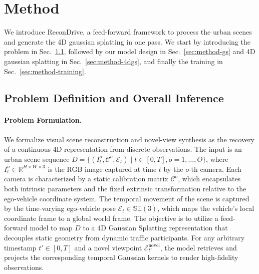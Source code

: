 \section{Method}
\label{sec:method}

We introduce ReconDrive, a feed-forward framework to process the urban scenes and generate the 4D gaussian splatting in one pass. We start by introducing the problem in Sec.~\ref{sec:method-problem}, followed by our model design in Sec.~\ref{sec:method-gs} and 4D gaussian splatting in Sec.~\ref{sec:method-4dgs}, and finally the training in Sec.~\ref{sec:method-training}.


\subsection{Problem Definition and Overall Inference}
\label{sec:method-problem}
\paragraph{Problem Formulation.} We formalize visual scene reconstruction and novel-view synthesis as the recovery of a continuous 4D representation from discrete observations. The input is an urban scene sequence $D = \{(I_t^o, \mathcal{C}^o, \mathcal{E}_t) \mid t \in [0, T], o=1,\dots,O\}$, where $I_t^o \in \mathbb{R}^{H \times W \times 3}$ is the RGB image captured at time $t$ by the $o$-th camera. Each camera is characterized by a static calibration matrix $\mathcal{C}^o$, which encapsulates both intrinsic parameters and the fixed extrinsic transformation relative to the ego-vehicle coordinate system. The temporal movement of the scene is captured by the time-varying ego-vehicle pose $\mathcal{E}_t \in \mathbb{SE}(3)$, which maps the vehicle's local coordinate frame to a global world frame. The objective is to utilize a feed-forward model to map $D$ to a 4D Gaussian Splatting representation that decouples static geometry from dynamic traffic participants. For any arbitrary timestamp $t' \in [0, T]$ and a novel viewpoint $\mathcal{E}_{t'}^{\text{novel}}$, the model retrieves and projects the corresponding temporal Gaussian kernels to render high-fidelity observations.

